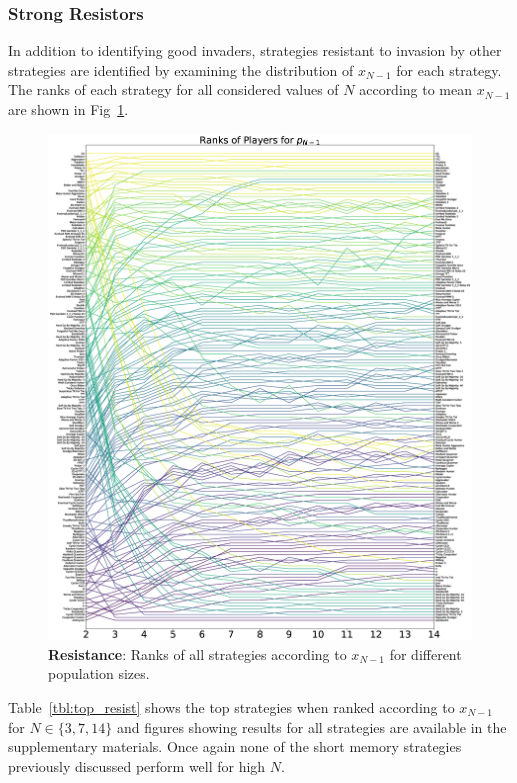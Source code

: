 \documentclass[10pt,letterpaper]{article}
\begin{document}
\subsubsection*{Strong Resistors}

In addition to identifying good invaders, strategies resistant to invasion by
other strategies are identified by examining the distribution of $x_{N-1}$ for
each strategy. The ranks of each strategy for all considered values of \(N\)
according to mean \(x_{N-1}\) are shown in Fig~\ref{fig:ranks_v_size_resist}.

\begin{figure}[!hbtp]
    \centering
    \includegraphics[draft, width=\columnwidth]{./Fig4.eps}
    \caption{\textbf{Resistance}: Ranks of all strategies according to \(x_{N-1}\) for different
    population sizes.}
    \label{fig:ranks_v_size_resist}
\end{figure}


Table~\ref{tbl:top_resist} shows the top strategies when ranked
according to \(x_{N-1}\) for \(N\in\{3, 7, 14\}\) and figures showing results
for all strategies are available in the supplementary materials.
Once again none of the short memory strategies previously discussed perform well
for high \(N\).
\end{document}
